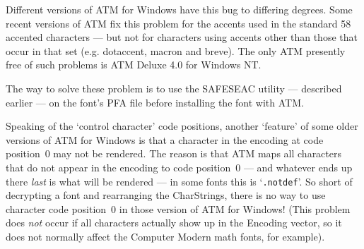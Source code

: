 Different versions of ATM for Windows have this bug to differing degrees.
Some recent versions of ATM fix this problem for the accents used in the
standard 58 accented characters --- but not for characters using
accents other than those that occur in that set
(e.g. dotaccent, macron and breve).
The only ATM presently free of such problems is ATM Deluxe 4.0 for Windows NT.





The way to solve these problem is to use the SAFESEAC utility --- described
earlier --- on the font's PFA file before installing the font with ATM.

Speaking of the `control character' code positions, another `feature' of 
some older versions of ATM for Windows is that a character in the encoding 
at code position~0 may not be rendered.  
The reason is that ATM maps all characters that
do not appear in the encoding to code position~0 --- and whatever ends
up there {\it last} is what will be rendered --- in some fonts this is 
`{\tt .notdef}'.  
So short of decrypting a font and rearranging the
Char\-Strings, there is no way to use character code position~0 in those
version of ATM for Windows!  
(This problem does {\it not} occur
if all characters actually show up in the Encoding vector, 
so it does not normally affect the Computer Modern math fonts, for example).

